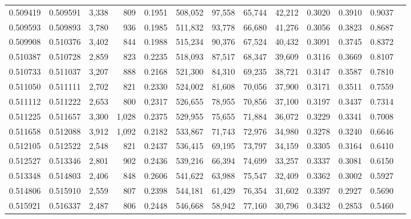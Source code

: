 \begin{tabular}{rrrrrrrrrrrrr}
0.509419 & 0.509591 &  3,338 &   809 &                                     0.1951 & 508,052 &  97,558 &  65,744 &  42,212 & 0.3020 & 0.3910 & 0.9037 \\
0.509593 & 0.509893 &  3,780 &   936 &                                     0.1985 & 511,832 &  93,778 &  66,680 &  41,276 & 0.3056 & 0.3823 & 0.8687 \\
0.509908 & 0.510376 &  3,402 &   844 &                                     0.1988 & 515,234 &  90,376 &  67,524 &  40,432 & 0.3091 & 0.3745 & 0.8372 \\
0.510387 & 0.510728 &  2,859 &   823 &                                     0.2235 & 518,093 &  87,517 &  68,347 &  39,609 & 0.3116 & 0.3669 & 0.8107 \\
0.510733 & 0.511037 &  3,207 &   888 &                                     0.2168 & 521,300 &  84,310 &  69,235 &  38,721 & 0.3147 & 0.3587 & 0.7810 \\
0.511050 & 0.511111 &  2,702 &   821 &                                     0.2330 & 524,002 &  81,608 &  70,056 &  37,900 & 0.3171 & 0.3511 & 0.7559 \\
0.511112 & 0.511222 &  2,653 &   800 &                                     0.2317 & 526,655 &  78,955 &  70,856 &  37,100 & 0.3197 & 0.3437 & 0.7314 \\
0.511225 & 0.511657 &  3,300 & 1,028 &                                     0.2375 & 529,955 &  75,655 &  71,884 &  36,072 & 0.3229 & 0.3341 & 0.7008 \\
0.511658 & 0.512088 &  3,912 & 1,092 &                                     0.2182 & 533,867 &  71,743 &  72,976 &  34,980 & 0.3278 & 0.3240 & 0.6646 \\
0.512105 & 0.512522 &  2,548 &   821 &                                     0.2437 & 536,415 &  69,195 &  73,797 &  34,159 & 0.3305 & 0.3164 & 0.6410 \\
0.512527 & 0.513346 &  2,801 &   902 &                                     0.2436 & 539,216 &  66,394 &  74,699 &  33,257 & 0.3337 & 0.3081 & 0.6150 \\
0.513348 & 0.514803 &  2,406 &   848 &                                     0.2606 & 541,622 &  63,988 &  75,547 &  32,409 & 0.3362 & 0.3002 & 0.5927 \\
0.514806 & 0.515910 &  2,559 &   807 &                                     0.2398 & 544,181 &  61,429 &  76,354 &  31,602 & 0.3397 & 0.2927 & 0.5690 \\
0.515921 & 0.516337 &  2,487 &   806 &                                     0.2448 & 546,668 &  58,942 &  77,160 &  30,796 & 0.3432 & 0.2853 & 0.5460 \\

\end{tabular}
